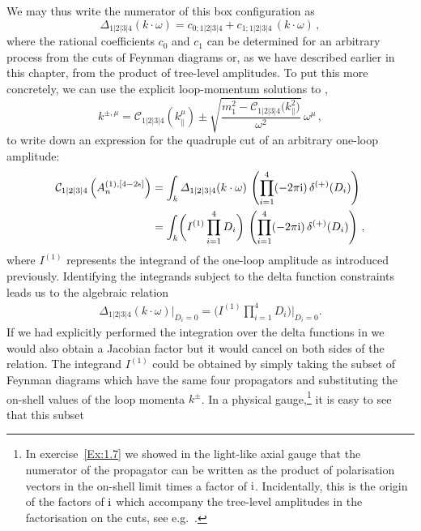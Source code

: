 We may thus write the numerator of this box configuration as
\begin{equation}
  \Delta_{1|2|3|4}(k\cdot\omega) = c_{0;1|2|3|4} + c_{1;1|2|3|4} \, (k\cdot\omega) \,,
  \label{eq:box4dintegrandparam}
\end{equation}
where the rational coefficients $c_0$ and $c_1$ can be determined for an
arbitrary process from the cuts of Feynman diagrams or, as we have described
earlier in this chapter, from the product of tree-level amplitudes. To put
this more concretely, we can use the explicit loop-momentum solutions to ,
\begin{equation}
  k^{\pm,\mu} = \mathcal{C}_{1|2|3|4}\left(k_{\parallel}^\mu\right) \pm \sqrt{\frac{m_1^2-\mathcal{C}_{1|2|3|4}\bigl(k_{\parallel}^2\bigr)}{\omega^2}} \, \omega^\mu \,,
\end{equation}
to write down an expression for the quadruple cut of an arbitrary one-loop amplitude:
\begin{align}
  \mathcal{C}_{1|2|3|4} \left(A_n^{(1),[4-2\eps]}\right) 
  & = \int_k \Delta_{1|2|3|4} (k \cdot \omega) \, \left(\prod_{i=1}^4 (-2\pi\i) \, \delta^{(+)}(D_i) \right)   \nonumber\\
  & = \int_k \biggl(I^{(1)} \prod_{i=1}^4 D_i \biggr) \,\left(\prod_{i=1}^4 (-2\pi\i) \, \delta^{(+)}(D_i) \right) \,,
  \label{eq:quadcutrelation1}
\end{align}
where $I^{(1)}$ represents the integrand of the one-loop amplitude as
introduced previously. Identifying the integrands subject to the delta function
constraints leads us to the algebraic relation
\begin{align}
  \Delta_{1|2|3|4} (k \cdot \omega) \bigg|_{D_i = 0} = \biggl(I^{(1)} \prod_{i=1}^4 D_i \biggr) \bigg|_{D_i = 0}.
  \label{eq:quadcutrelation2}
\end{align}
If we had explicitly performed the integration over the delta functions in
 we would also obtain a Jacobian factor but it would
cancel on both sides of the relation.  The integrand $I^{(1)}$ could be
obtained by simply taking the subset of Feynman diagrams which have the same
four propagators and substituting the on-shell values of the loop momenta
$k^\pm$. In a physical gauge,\footnote{In exercise~\ref{Ex:1.7} we showed in
the light-like axial gauge that the numerator of the propagator can be written
as the product of polarisation vectors in the on-shell limit times a factor of
$\mathrm{i}$. Incidentally, this is the origin of the factors of $\mathrm{i}$ which accompany
the tree-level amplitudes in the factorisation on the cuts, see e.g.\
.} it is easy to see that this subset

